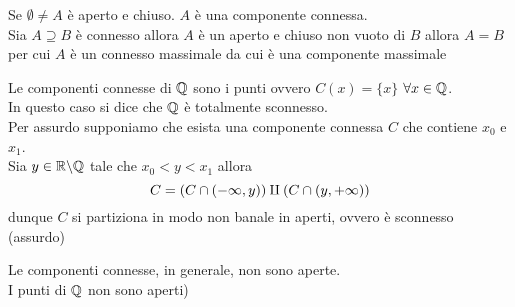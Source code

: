 \begin{oss}Se $\emptyset\neq A$ \`e aperto e chiuso. $A$ \`e una componente connessa.\\
Sia $A\supseteq B$ \`e connesso allora $A$ \`e un aperto e chiuso non vuoto di $B$ allora $A=B$ per cui $A$ \`e un connesso massimale da cui \`e una componente massimale
\end{oss}
\begin{oss}Le componenti connesse di $\mathbb{Q}$ sono i punti ovvero $C(x)=\{x\} $ $\forall x \in \mathbb{Q}$.\\
In questo caso si dice che $\mathbb{Q}$ \`e totalmente sconnesso.\\
Per assurdo supponiamo che esista una componente connessa $C$ che contiene $x_0$ e $x_1$.\\
Sia $y \in \mathbb{R} \backslash \mathbb{Q}$ tale che $x_0< y< x_1$ allora
$$ C = ( C \cap (-\infty,y) ) \amalg ( C \cap (y,+\infty))$$
dunque $C$ si partiziona in modo non banale in aperti, ovvero \`e sconnesso (assurdo)
\end{oss}
\begin{oss}Le componenti connesse, in generale, non sono aperte.\\
I punti di $\mathbb{Q}$ non sono aperti)
\end{oss}
